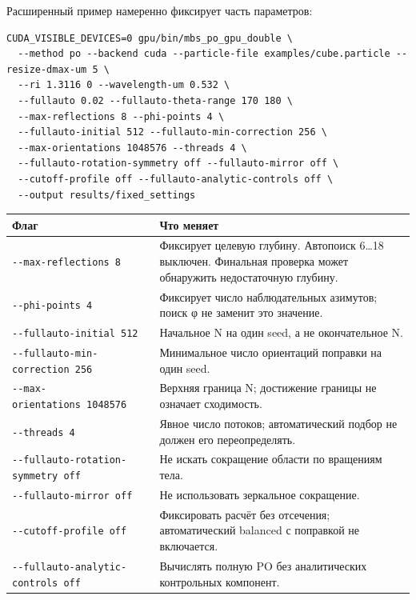 Расширенный пример намеренно фиксирует часть параметров:

\noindent\begin{minipage}{\linewidth}
\begin{verbatim}
CUDA_VISIBLE_DEVICES=0 gpu/bin/mbs_po_gpu_double \
  --method po --backend cuda --particle-file examples/cube.particle --resize-dmax-um 5 \
  --ri 1.3116 0 --wavelength-um 0.532 \
  --fullauto 0.02 --fullauto-theta-range 170 180 \
  --max-reflections 8 --phi-points 4 \
  --fullauto-initial 512 --fullauto-min-correction 256 \
  --max-orientations 1048576 --threads 4 \
  --fullauto-rotation-symmetry off --fullauto-mirror off \
  --cutoff-profile off --fullauto-analytic-controls off \
  --output results/fixed_settings
\end{verbatim}
\end{minipage}

\begin{longtable}[]{@{}
  >{\raggedright\arraybackslash}p{}
  >{\raggedright\arraybackslash}p{}@{}}
\toprule\noalign{}
\begin{minipage}[b]{\linewidth}\raggedright
Флаг
\end{minipage} & \begin{minipage}[b]{\linewidth}\raggedright
Что меняет
\end{minipage} \\
\midrule\noalign{}
\endhead
\bottomrule\noalign{}
\endlastfoot
\texttt{-\/-max-reflections\ 8} & Фиксирует целевую глубину. Автопоиск
6\ldots18 выключен. Финальная проверка может обнаружить недостаточную
глубину. \\
\texttt{-\/-phi-points\ 4} & Фиксирует число наблюдательных азимутов;
поиск φ не заменит это значение. \\
\texttt{-\/-fullauto-initial\ 512} & Начальное N на один seed, а не
окончательное N. \\
\texttt{-\/-fullauto-min-correction\ 256} & Минимальное число ориентаций
поправки на один seed. \\
\texttt{-\/-max-orientations\ 1048576} & Верхняя граница N; достижение
границы не означает сходимость. \\
\texttt{-\/-threads\ 4} & Явное число потоков; автоматический подбор не
должен его переопределять. \\
\texttt{-\/-fullauto-rotation-symmetry\ off} & Не искать сокращение
области по вращениям тела. \\
\texttt{-\/-fullauto-mirror\ off} & Не использовать зеркальное
сокращение. \\
\texttt{-\/-cutoff-profile\ off} & Фиксировать расчёт без отсечения;
автоматический balanced с поправкой не включается. \\
\texttt{-\/-fullauto-analytic-controls\ off} & Вычислять полную PO без
аналитических контрольных компонент. \\
\end{longtable}

